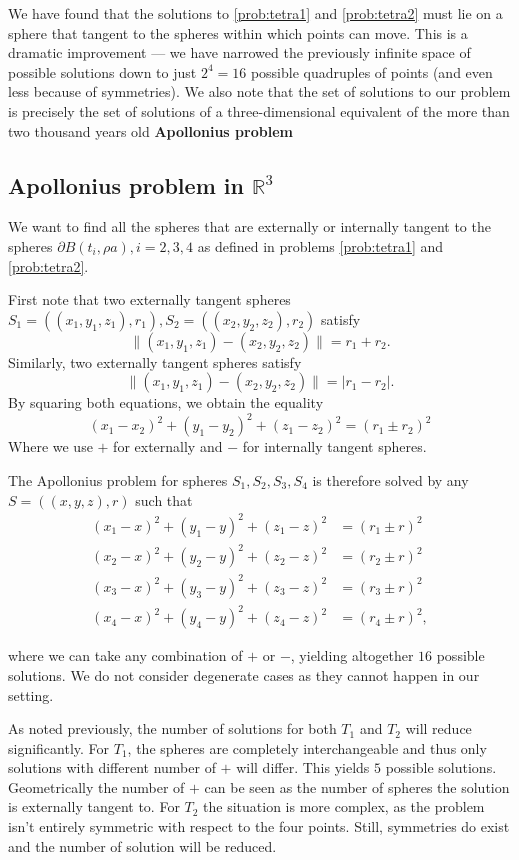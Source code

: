 We have found that the solutions to \ref{prob:tetra1} and \ref{prob:tetra2} must lie on a sphere that tangent to the spheres within which points can move. This is a dramatic improvement --- we have narrowed the previously infinite space of possible solutions down to just $2^4=16$ possible quadruples of points (and even less because of symmetries). We also note that the set of solutions to our problem is precisely the set of solutions of a three-dimensional equivalent of the more than two thousand years old  \textbf{Apollonius problem} 


\subsection{Apollonius problem in $\mathbb R^3$}
We want to find all the spheres that are externally or internally tangent to the spheres $\partial B(t_i,\rho a), i=2,3,4$ as defined in problems \ref{prob:tetra1} and \ref{prob:tetra2}.

First note that two externally tangent spheres $S_1=((x_1,y_1,z_1),r_1), S_2=((x_2,y_2,z_2),r_2)$  satisfy
$$\|(x_1,y_1,z_1) - (x_2,y_2,z_2)\| = r_1+r_2.$$
Similarly, two externally tangent spheres satisfy
$$\|(x_1,y_1,z_1) - (x_2,y_2,z_2)\| = |r_1 - r_2|.$$
By squaring both equations, we obtain the equality
$$(x_1-x_2)^2 + (y_1-y_2)^2 + (z_1-z_2)^2 = (r_1 \pm r_2)^2$$
Where we use $+$ for externally and $-$ for internally tangent spheres.

The Apollonius problem for spheres $S_1,S_2,S_3,S_4$ is therefore solved by any $S=((x,y,z),r)$ such that
\begin{align}\label{eq:Apollonius}
  (x_1-x)^2 + (y_1-y)^2 + (z_1-z)^2 &= (r_1 \pm r)^2 \\
  (x_2-x)^2 + (y_2-y)^2 + (z_2-z)^2 &= (r_2 \pm r)^2 \nonumber \\
  (x_3-x)^2 + (y_3-y)^2 + (z_3-z)^2 &= (r_3 \pm r)^2 \nonumber \\
  (x_4-x)^2 + (y_4-y)^2 + (z_4-z)^2 &= (r_4 \pm r)^2, \nonumber  
\end{align}

where we can take any combination of $+$ or $-$, yielding altogether $16$ possible solutions. We do not consider degenerate cases as they cannot happen in our setting. 

As noted previously, the number of solutions for both $T_1$ and $T_2$ will reduce significantly. For $T_1$, the spheres are completely interchangeable and thus only solutions with different number of $+$ will differ. This yields $5$ possible solutions. Geometrically the number of $+$ can be seen as the number of spheres the solution is externally tangent to. For $T_2$ the situation is more complex, as the problem isn't entirely symmetric with respect to the four points. Still, symmetries do exist and the number of solution will be reduced.  


